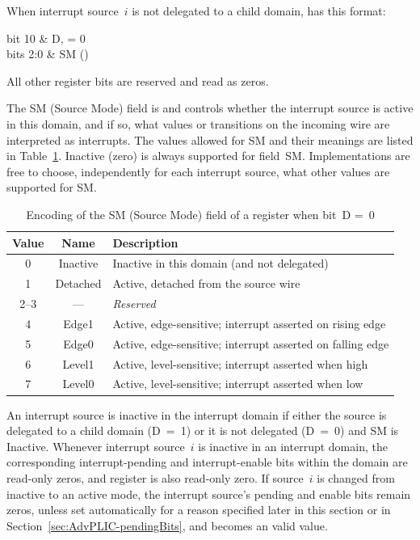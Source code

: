 When interrupt source~$i$ is not delegated to a child domain,
 has this format:\nopagebreak
\begin{displayLinesTable}[l@{\qquad}l]
bit 10   & D, = 0 \\
bits 2:0 & SM (\WARL) \\
\end{displayLinesTable}
All other register bits are reserved and read as zeros.

The SM (Source Mode) field is {\WARL} and controls whether the
interrupt source is active in this domain, and if so, what values or
transitions on the incoming wire are interpreted as interrupts.
The values allowed for SM and their meanings are listed in
Table~\ref{tab:AdvPLIC-sourcecfg-SM}.
Inactive (zero) is always supported for field~SM.
Implementations are free to choose, independently for each interrupt
source, what other values are supported for SM.

\begin{table}[h!]
\begin{center}
\begin{tabular}{|c|c|l|}
\hline
Value & Name   & Description \\
\hline
\hline
0    & Inactive & Inactive in this domain (and not delegated) \\
1    & Detached & Active, detached from the source wire \\
2--3 & ---      & \emph{Reserved} \\
4    & Edge1    & Active, edge-sensitive; interrupt asserted on rising edge \\
5    & Edge0    & Active, edge-sensitive; interrupt asserted on falling edge \\
6    & Level1   & Active, level-sensitive; interrupt asserted when high \\
7    & Level0   & Active, level-sensitive; interrupt asserted when low \\
\hline
\end{tabular}
\end{center}
\caption{%
Encoding of the SM (Source Mode) field of a  register when
bit~D =~0%
}
\label{tab:AdvPLIC-sourcecfg-SM}
\end{table}

An interrupt source is inactive in the interrupt domain if either the
source is delegated to a child domain (D~=~1) or it is not delegated
(D~=~0) and SM is Inactive.
Whenever interrupt source~$i$ is inactive in an interrupt domain,
the corresponding interrupt-pending and interrupt-enable bits within
the domain are read-only zeros, and register  is also
read-only zero.
If source~$i$ is changed from inactive to an active mode, the
interrupt source's pending and enable bits remain zeros, unless set
automatically for a reason specified later in this section or in
Section~\ref{sec:AdvPLIC-pendingBits}, and  becomes an
{\unspecified} valid value.

